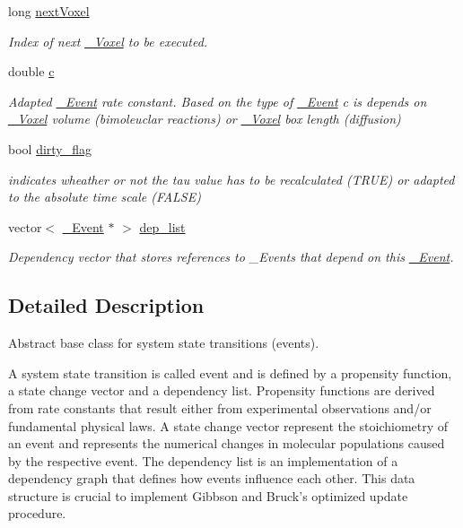 \begin{DoxyCompactItemize}
long \hyperlink{classnw_1_1___event_a7864559e204c087306e3becb5b81fb26}{next\+Voxel}
\begin{DoxyCompactList}\small\item\em Index of next \hyperlink{classnw_1_1___voxel}{\+\_\+\+Voxel} to be executed. \end{DoxyCompactList}\item 
double \hyperlink{classnw_1_1___event_a29c77fb164e745cdb5c5fda4f191cd37}{c}
\begin{DoxyCompactList}\small\item\em Adapted \hyperlink{classnw_1_1___event}{\+\_\+\+Event} rate constant. Based on the type of \hyperlink{classnw_1_1___event}{\+\_\+\+Event} {\ttfamily c} is depends on \hyperlink{classnw_1_1___voxel}{\+\_\+\+Voxel} volume (bimoleuclar reactions) or \hyperlink{classnw_1_1___voxel}{\+\_\+\+Voxel} box length (diffusion) \end{DoxyCompactList}\item 
bool \hyperlink{classnw_1_1___event_aaa705b35c06c0cb2e0a4f3daa9ee8037}{dirty\+\_\+flag}
\begin{DoxyCompactList}\small\item\em indicates wheather or not the tau value has to be recalculated ({\ttfamily T\+R\+U\+E}) or adapted to the absolute time scale ({\ttfamily F\+A\+L\+S\+E}) \end{DoxyCompactList}\item 
vector$<$ \hyperlink{classnw_1_1___event}{\+\_\+\+Event} $\ast$ $>$ \hyperlink{classnw_1_1___event_a3f87b2dff69d07977f0a5e10936f38f6}{dep\+\_\+list}
\begin{DoxyCompactList}\small\item\em Dependency vector that stores references to \+\_\+\+Events that depend on this \hyperlink{classnw_1_1___event}{\+\_\+\+Event}. \end{DoxyCompactList}\end{DoxyCompactItemize}


\subsection{Detailed Description}
Abstract base class for system state transitions (events). 

A system state transition is called event and is defined by a propensity function, a state change vector and a dependency list. Propensity functions are derived from rate constants that result either from experimental observations and/or fundamental physical laws. A state change vector represent the stoichiometry of an event and represents the numerical changes in molecular populations caused by the respective event. The dependency list is an implementation of a dependency graph that defines how events influence each other. This data structure is crucial to implement Gibbson and Bruck's optimized update procedure. 


